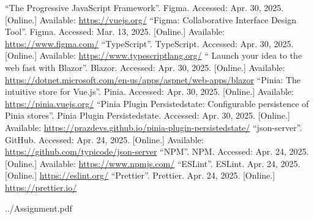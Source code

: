 \documentclass[12pt, a4paper]{article}
\begin{document}
\begin{thebibliography}{9}
        ``The Progressive JavaScript Framework''. Figma. Accessed: Apr. 30, 2025. [Online.]
        Available: \url{https://vuejs.org/}
        ``Figma: Collaborative Interface Design Tool''. Figma. Accessed: Mar. 13, 2025. [Online.]
        Available: \url{https://www.figma.com/}
        ``TypeScript''. TypeScript. Accessed: Apr. 30, 2025. [Online.] Available:
        \url{https://www.typescriptlang.org/}
        `` Launch your idea to the web fast with Blazor''. Blazor. Accessed: Apr. 30, 2025.
        [Online.] Available: \url{https://dotnet.microsoft.com/en-us/apps/aspnet/web-apps/blazor}
        ``Pinia: The intuitive store for Vue.js''. Pinia. Accessed: Apr. 30, 2025. [Online.]
        Available: \url{https://pinia.vuejs.org/}
        ``Pinia Plugin Persistedstate: Configurable persistence of Pinia stores''.
        Pinia Plugin Persistedstate. Accessed: Apr. 30, 2025. [Online.] Available:
        \url{https://prazdevs.github.io/pinia-plugin-persistedstate/}
        ``json-server''. GitHub. Accessed: Apr. 24, 2025. [Online.] Available:
        \url{https://github.com/typicode/json-server}
        ``NPM''. NPM. Accessed: Apr. 24, 2025. [Online.] Available: \url{https://www.npmjs.com/}
        ``ESLint''. ESLint. Apr. 24, 2025. [Online.] \url{https://eslint.org/}
        ``Prettier''. Prettier. Apr. 24, 2025. [Online.] \url{https://prettier.io/}
\end{thebibliography}
\endgroup


    {../Assignment.pdf}

\end{document}
